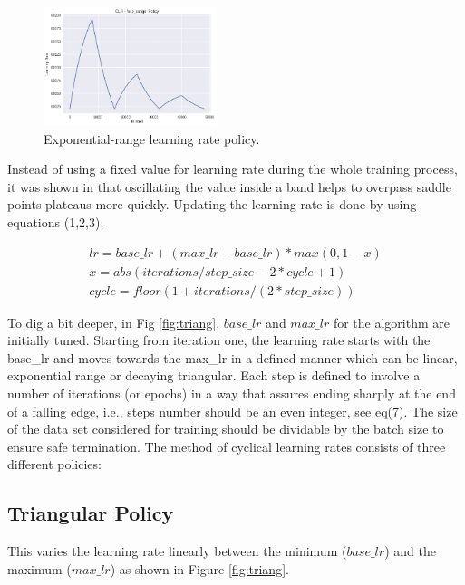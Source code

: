 \documentclass[journal, a4paper]{IEEEtran}
\begin{document}
\begin{figure}[h!]
    \centering
    \includegraphics[width=0.45\textwidth]{images/it_lr_exp.png} 
    \caption{Exponential-range learning rate policy. }
    \label{fig:exp}
\end{figure}    
    Instead of using a fixed value for learning rate during the whole training process, it was shown in \cite{CLR} that oscillating the value inside a band helps to overpass saddle points plateaus more quickly.
    Updating the learning rate is done by using equations (1,2,3)\cite{CLR}.
    \begin{framed}
    \begin{eqnarray}
    lr = base\_lr + (max\_lr-base\_lr) * max(0,1-x)\\
    x = abs(iterations/step\_size - 2*cycle + 1)\\
    cycle = floor(1+iterations/(2*step\_size))
    \end{eqnarray}
    \end{framed}
    To dig a bit deeper, in Fig \ref{fig:triang}, $base\_lr$ and $max\_lr$ for the algorithm are initially tuned. Starting from iteration one, the learning rate starts with the base\_lr and moves towards the max\_lr in a defined manner which can be linear, exponential range or decaying triangular. Each step is defined to involve a number of iterations (or epochs) in a way that assures ending sharply at the end of a falling edge, i.e., steps number should be an even integer, see eq(7). The size of the data set considered for training should be dividable by the batch size to ensure safe termination. 
The method of cyclical learning rates consists of three different policies:
    \subsection{Triangular Policy}
    \label{sec:triang}
    This varies the learning rate linearly between the minimum ($base\_lr$) and the maximum ($max\_lr$) as shown in Figure \ref{fig:triang}.
\end{document}
